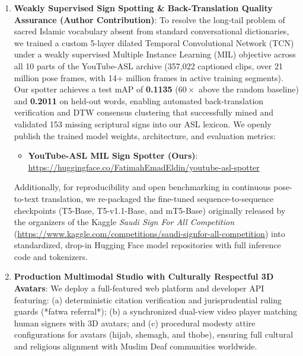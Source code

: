 \begin{enumerate}[leftmargin=*,itemsep=4pt]
  \item \textbf{Weakly Supervised Sign Spotting \& Back-Translation Quality Assurance (Author Contribution)}:
    To resolve the long-tail problem of sacred Islamic vocabulary absent from standard conversational dictionaries, we trained a custom 5-layer dilated Temporal Convolutional Network (TCN) under a weakly supervised Multiple Instance Learning (MIL) objective across all 10 parts of the YouTube-ASL archive (357,022 captioned clips, over 21 million pose frames, with 14+ million frames in active training segments). Our spotter achieves a test mAP of \textbf{0.1135} ($60\times$ above the random baseline) and \textbf{0.2011} on held-out words, enabling automated back-translation verification and DTW consensus clustering that successfully mined and validated 153 missing scriptural signs into our ASL lexicon. We openly publish the trained model weights, architecture, and evaluation metrics:
    \begin{itemize}[leftmargin=*,itemsep=2pt]
      \item \textbf{YouTube-ASL MIL Sign Spotter (Ours)}:\\
        \url{https://huggingface.co/FatimahEmadEldin/youtube-asl-spotter}
    \end{itemize}
    Additionally, for reproducibility and open benchmarking in continuous pose-to-text translation, we re-packaged the fine-tuned sequence-to-sequence checkpoints (T5-Base, T5-v1.1-Base, and mT5-Base) originally released by the organizers of the Kaggle \emph{Saudi Sign For All Competition} (\url{https://www.kaggle.com/competitions/saudi-signfor-all-competition}) into standardized, drop-in Hugging Face model repositories with full inference code and tokenizers.

  \item \textbf{Production Multimodal Studio with Culturally Respectful 3D Avatars}:
    We deploy a full-featured web platform and developer API featuring: (a) deterministic citation verification and jurisprudential ruling guards (*fatwa referral*); (b) a synchronized dual-view video player matching human signers with 3D avatars; and (c) procedural modesty attire configurations for avatars (hijab, shemagh, and thobe), ensuring full cultural and religious alignment with Muslim Deaf communities worldwide.
\end{enumerate}


